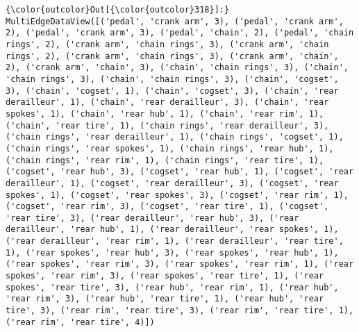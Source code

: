 \documentclass[11pt]{article}
\begin{document}
\begin{Verbatim}[commandchars=\\\{\}]
{\color{outcolor}Out[{\color{outcolor}318}]:} MultiEdgeDataView([('pedal', 'crank arm', 3), ('pedal', 'crank arm', 2), ('pedal', 'crank arm', 3), ('pedal', 'chain', 2), ('pedal', 'chain rings', 2), ('crank arm', 'chain rings', 3), ('crank arm', 'chain rings', 2), ('crank arm', 'chain rings', 3), ('crank arm', 'chain', 2), ('crank arm', 'chain', 3), ('chain', 'chain rings', 3), ('chain', 'chain rings', 3), ('chain', 'chain rings', 3), ('chain', 'cogset', 3), ('chain', 'cogset', 1), ('chain', 'cogset', 3), ('chain', 'rear derailleur', 1), ('chain', 'rear derailleur', 3), ('chain', 'rear spokes', 1), ('chain', 'rear hub', 1), ('chain', 'rear rim', 1), ('chain', 'rear tire', 1), ('chain rings', 'rear derailleur', 3), ('chain rings', 'rear derailleur', 1), ('chain rings', 'cogset', 1), ('chain rings', 'rear spokes', 1), ('chain rings', 'rear hub', 1), ('chain rings', 'rear rim', 1), ('chain rings', 'rear tire', 1), ('cogset', 'rear hub', 3), ('cogset', 'rear hub', 1), ('cogset', 'rear derailleur', 1), ('cogset', 'rear derailleur', 3), ('cogset', 'rear spokes', 1), ('cogset', 'rear spokes', 3), ('cogset', 'rear rim', 1), ('cogset', 'rear rim', 3), ('cogset', 'rear tire', 1), ('cogset', 'rear tire', 3), ('rear derailleur', 'rear hub', 3), ('rear derailleur', 'rear hub', 1), ('rear derailleur', 'rear spokes', 1), ('rear derailleur', 'rear rim', 1), ('rear derailleur', 'rear tire', 1), ('rear spokes', 'rear hub', 3), ('rear spokes', 'rear hub', 1), ('rear spokes', 'rear rim', 3), ('rear spokes', 'rear rim', 1), ('rear spokes', 'rear rim', 3), ('rear spokes', 'rear tire', 1), ('rear spokes', 'rear tire', 3), ('rear hub', 'rear rim', 1), ('rear hub', 'rear rim', 3), ('rear hub', 'rear tire', 1), ('rear hub', 'rear tire', 3), ('rear rim', 'rear tire', 3), ('rear rim', 'rear tire', 1), ('rear rim', 'rear tire', 4)])
\end{Verbatim}
            
\end{document}
